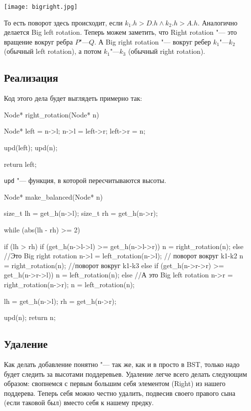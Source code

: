 \begin{center} \texttt{[image: bigright.jpg]} \end{center}

То есть поворот здесь происходит, если $k_1.h > D.h \land k_2.h > A.h$.
Аналогично делается Big left rotation.
Теперь можем заметить, что Right rotation "--- это вращение вокруг ребра $P$"---$Q$.
А Big right rotation "--- вокруг ребер $k_1$"---$k_2$ (обычный left rotation), а потом $k_1$"---$k_3$ (обычный right rotation).

\subsection{Реализация}

Код этого дела будет выглядеть примерно так:
\begin{cppcode}
Node* right_rotation(Node* n) {
	Node* left = n->l;
	n->l = left->r;
	left->r = n;

	upd(left); upd(n);

	return left;
}
\end{cppcode}
\texttt{upd} "--- функция, в которой пересчитываются высоты.

\begin{cppcode}
Node* make_balanced(Node* n) {
	size_t lh = get_h(n->l);
	size_t rh = get_h(n->r);

	while (abs(lh - rh) >= 2) {
		if (lh > rh) {
			if (get_h(n->l->l) >= get_h(n->l->r)) {
				n = right_rotation(n);
			} else { //Это Big right rotation
				n->l = left\_rotation(n->l); // поворот вокруг k1-k2
				n = right\_rotation(n); //поворот вокруг k1-k3
			}
		} else {
			if (get_h(n->r->r) >= get_h(n->r->l)) {
				n = left_rotation(n);
			} else { //А это Big left rotation
				n->r = right_rotation(n->r);
				n = left_rotation(n);
			}
		}

		lh = get_h(n->l);
		rh = get_h(n->r);
	}

	upd(n);
	return n;
}
\end{cppcode}

\subsection{Удаление}

Как делать добавление понятно "--- так же, как и в просто в BST, только надо будет следить за высотами поддеревьев.
Удаление легче всего делать следующим образом: свопнемся с первым большим себя элементом (Right) из нашего поддерева.
Теперь себя можно честно удалить, подвесив своего правого сына (если таковой был) вместо себя к нашему предку.

